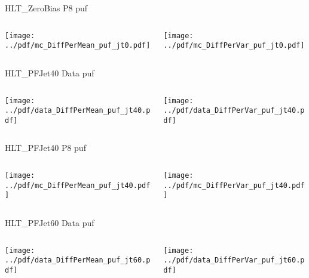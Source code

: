 \documentclass[9pt]{beamer}
\begin{document}
\begin{frame}[t]{HLT\_ZeroBias P8 puf}
\begin{columns}[T]
  \begin{column}{.5\textwidth}
  \texttt{[image: ../pdf/mc\_DiffPerMean\_puf\_jt0.pdf]}
  \end{column}
  \begin{column}{.5\textwidth}
  \texttt{[image: ../pdf/mc\_DiffPerVar\_puf\_jt0.pdf]}
  \end{column}
\end{columns}
\end{frame}

\begin{frame}[t]{HLT\_PFJet40 Data puf}
\begin{columns}[T]
  \begin{column}{.5\textwidth}
  \texttt{[image: ../pdf/data\_DiffPerMean\_puf\_jt40.pdf]}
  \end{column}
  \begin{column}{.5\textwidth}
  \texttt{[image: ../pdf/data\_DiffPerVar\_puf\_jt40.pdf]}
  \end{column}
\end{columns}
\end{frame}

\begin{frame}[t]{HLT\_PFJet40 P8 puf}
\begin{columns}[T]
  \begin{column}{.5\textwidth}
  \texttt{[image: ../pdf/mc\_DiffPerMean\_puf\_jt40.pdf]}
  \end{column}
  \begin{column}{.5\textwidth}
  \texttt{[image: ../pdf/mc\_DiffPerVar\_puf\_jt40.pdf]}
  \end{column}
\end{columns}
\end{frame}

\begin{frame}[t]{HLT\_PFJet60 Data puf}
\begin{columns}[T]
  \begin{column}{.5\textwidth}
  \texttt{[image: ../pdf/data\_DiffPerMean\_puf\_jt60.pdf]}
  \end{column}
  \begin{column}{.5\textwidth}
  \texttt{[image: ../pdf/data\_DiffPerVar\_puf\_jt60.pdf]}
  \end{column}
\end{columns}
\end{frame}
\end{document}
